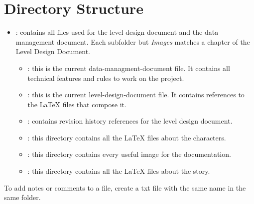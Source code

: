 \documentclass[12pt]{article}
\begin{document}
\section{Directory Structure}
\begin{itemize}
\item \textbf{}: contains all files used for the level design document and the data management document. Each subfolder but \textit{Images} matches a chapter of the Level Design Document.
  \begin{itemize}
    \item \textbf{}: this is the current data-managment-document file. It contains all technical features and rules to work on the project.

    \item \textbf{}: this is the current level-design-document file. It contains references to the LaTeX files that compose it.

    \item \textbf{}: contains revision history references for the level design document.

    \item \textbf{}: this directory contains all the LaTeX files about the characters.

    \item \textbf{}: this directory contains every useful image for the documentation.

    \item \textbf{}: this directory contains all the LaTeX files about the story.
  \end{itemize}
\end{itemize}

To add notes or comments to a file, create a txt file with the same name in the same folder.
\end{document}
